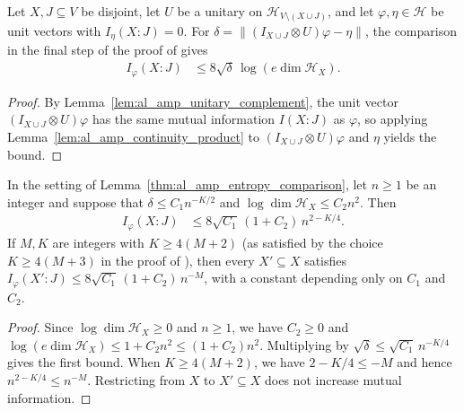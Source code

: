 \begin{lemma}
    \label{thm:al_amp_entropy_comparison}
    Let $X,J\subseteq V$ be disjoint, let $U$ be a unitary on
    $\mathcal H_{V\setminus(X\cup J)}$, and let $\varphi,\eta\in\mathcal H$
    be unit vectors with $I_\eta(X:J)=0$. For
    $\delta=\|(I_{X\cup J}\otimes U)\varphi-\eta\|$, the comparison in the
    final step of the proof of \cite[Proposition~10.2]{OpenAI2026AreaLaw} gives
    \begin{align*}
        I_\varphi(X:J) & \le 8\sqrt\delta\,\log(e\dim\mathcal H_X).
    \end{align*}
\end{lemma}
\begin{proof}\leanok
    By Lemma~\ref{lem:al_amp_unitary_complement}, the unit vector
    $(I_{X\cup J}\otimes U)\varphi$ has the same mutual information $I(X:J)$ as
    $\varphi$, so applying Lemma~\ref{lem:al_amp_continuity_product} to
    $(I_{X\cup J}\otimes U)\varphi$ and $\eta$ yields the bound.
\end{proof}

\begin{lemma}
    \label{thm:al_amp_entropy_comparison_scale}
    In the setting of Lemma~\ref{thm:al_amp_entropy_comparison}, let
    $n\ge1$ be an integer and suppose that $\delta\le C_1n^{-K/2}$ and
    $\log\dim\mathcal H_X\le C_2n^2$. Then
    \begin{align*}
        I_\varphi(X:J) & \le 8\sqrt{C_1}\,(1+C_2)\,n^{2-K/4}.
    \end{align*}
    If $M,K$ are integers with $K\ge4(M+2)$ (as satisfied by the choice
    $K\ge4(M+3)$ in the proof of \cite[Proposition~10.2]{OpenAI2026AreaLaw}),
    then every $X'\subseteq X$ satisfies
    $I_\varphi(X':J)\le8\sqrt{C_1}\,(1+C_2)\,n^{-M}$, with a constant
    depending only on $C_1$ and $C_2$.
\end{lemma}
\begin{proof}\leanok
    Since $\log\dim\mathcal H_X\ge0$ and $n\ge1$, we have $C_2\ge0$ and
    $\log(e\dim\mathcal H_X)\le1+C_2n^2\le(1+C_2)n^2$. Multiplying by
    $\sqrt\delta\le\sqrt{C_1}\,n^{-K/4}$ gives the first bound. When
    $K\ge4(M+2)$, we have $2-K/4\le-M$ and hence $n^{2-K/4}\le n^{-M}$.
    Restricting from $X$ to $X'\subseteq X$ does not increase mutual
    information.
\end{proof}


